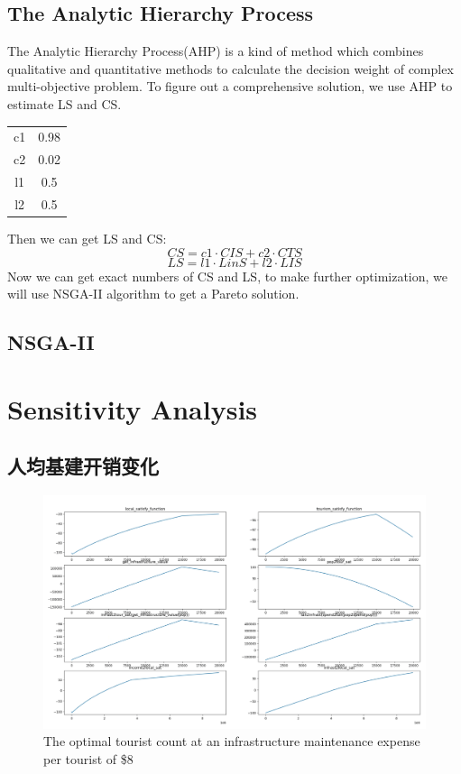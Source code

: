 \documentclass[12pt]{article}  %
\begin{document}
 \subsection{The Analytic Hierarchy Process}
 The Analytic Hierarchy Process(AHP) is a kind of method which combines qualitative and quantitative methods to calculate the decision weight of complex multi-objective problem. To figure out a comprehensive solution, we use AHP to estimate LS and CS.
 \begin{table}[H]
    \begin{center}
    \begin{tabular}{c|c}
    c1 & 0.98 \\
    c2 & 0.02 \\
    l1 & 0.5  \\
    l2 & 0.5 \\
    \end{tabular}
\end{center}
    \end{table}
    Then we can get LS and CS:\\
$$CS=c1\cdot CIS+c2\cdot CTS$$
$$LS=l1\cdot LinS+l2\cdot LIS$$
Now we can get exact numbers of CS and LS, to make further optimization, we will use NSGA-II algorithm to get a Pareto solution.
 \subsection{NSGA-II }
 
 
 

 \section{Sensitivity Analysis}
 \subsection{人均基建开销变化}
 
 
 \begin{figure}[H]  %
 
 \centering  %
 \includegraphics[width=.9\textwidth]{sensitivity12.png} %
 \caption{The optimal tourist count at an infrastructure maintenance expense per tourist of \$8} %
 \label{figx}%
 \end{figure}
\end{document}
